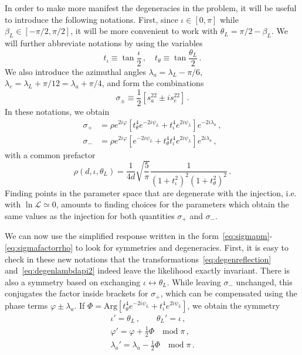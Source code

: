 \documentclass[aps,showpacs,twocolumn,prd,superscriptaddress,nofootinbib]{revtex4-1}
\newcommand{\be}{\begin{equation}}
\newcommand{\ee}{\end{equation}}
\newcommand{\bsub}{\begin{subequations}}
\newcommand{\esub}{\end{subequations}}
\newcommand\calL{{\mathcal{L}}}
\newcommand{\nn}{\nonumber}
\newcommand\psiL{{\psi_{L}}}
\begin{document}
In order to make more manifest the degeneracies in the problem, it will be useful to introduce the following notations. First, since $\iota \in [0, \pi]$ while $\beta_{L} \in [-\pi/2, \pi/2]$, it will be more convenient to work with $\theta_{L} = \pi/2 - \beta_{L}$. We will further abbreviate notations by using the variables
\be
	t_{\iota} \equiv \tan \frac{\iota}{2} \,, \quad t_{\theta} \equiv \tan \frac{\theta_{L}}{2} \,.
\ee
We also introduce the azimuthal angles $\lambda_{a} = \lambda_{L} - \pi/6$, $\lambda_{e} = \lambda_{L} + \pi/12 = \lambda_{a} + \pi/4$, and form the combinations
\be
	\sigma_{\pm} \equiv \frac{1}{2} \left[ s_{a}^{22} \pm i s_{e}^{22} \right] \,.
\ee
In these notations, we obtain
\bsub\label{eq:sigmapm}
\begin{align}
	\sigma_{+} &= \rho e^{2i\varphi} \left[ t_{\theta}^{4} e^{-2 i \psiL} + t_{\iota}^{4} e^{2 i \psiL} \right] e^{-2i \lambda_{a}} \,, \\
	\sigma_{-} &= \rho e^{2i\varphi} \left[ e^{-2 i \psiL} + t_{\theta}^{4} t_{\iota}^{4} e^{2 i \psiL} \right] e^{2i \lambda_{a}} \,,
\end{align}
\esub
with a common prefactor
\be\label{eq:sigmafactorrho}
	\rho(d, \iota, \theta_{L}) = \frac{1}{4d} \sqrt{\frac{5}{\pi}} \frac{1}{\left( 1 + t_{\iota}^{2} \right)^{2} \left(1 + t_{\theta}^{2} \right)^{2}} \,.
\ee
Finding points in the parameter space that are degenerate with the injection, i.e. with $\ln \calL \simeq 0$, amounts to finding choices for the parameters which obtain the same values as the injection for both quantities $\sigma_{+}$ and $\sigma_{-}$.

We can now use the simplified response written in the form~\eqref{eq:sigmapm}-\eqref{eq:sigmafactorrho} to look for symmetries and degeneracies. First, it is easy to check in these new notations that the transformations~\eqref{eq:degenreflection} and~\eqref{eq:degenlambdapi2} indeed leave the likelihood exactly invariant. There is also a symmetry based on exchanging $\iota \leftrightarrow \theta_{L}$. While leaving $\sigma_-$ unchanged, this conjugates the factor inside brackets for $\sigma_{+}$, which can be compensated using the phase terms $\varphi \pm \lambda_{a}$. If $\Phi = \mathrm{Arg} \left[ t_{\theta}^{4} e^{-2 i \psiL} + t_{\iota}^{4} e^{2 i \psiL} \right] $, we obtain the symmetry
\begin{align}
	\iota' = \theta_{L} \,, \qquad \theta_{L}' = \iota \,, \nn\\
	\varphi' = \varphi + \frac{1}{2} \Phi \quad \mathrm{mod} \; \pi\,, \nn\\
	\lambda_{a}' = \lambda_{a} - \frac{1}{2} \Phi \quad \mathrm{mod} \; \pi\,.
\end{align}
\end{document}
